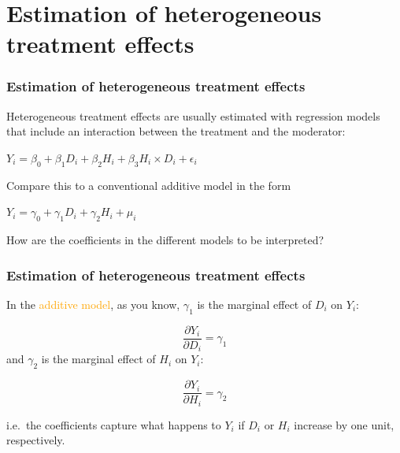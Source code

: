 \documentclass[12pt,english,dvipsnames,aspectratio=169,handout]{beamer}\usepackage[]{graphicx}\usepackage[]{xcolor}
\begin{document}
\section{Estimation of heterogeneous treatment effects}

\begin{frame}
  \frametitle{Estimation of heterogeneous treatment effects}
\footnotesize
Heterogeneous treatment effects are usually estimated with regression models that include an interaction between the treatment and the moderator:

$Y_i = \beta_0 + \beta_1 D_i + \beta_2 H_i + \beta_3 H_i \times D_i + \epsilon_i$

Compare this to a conventional additive model in the form

$Y_i = \gamma_0 + \gamma_1 D_i + \gamma_2 H_i + \mu_i$

How are the coefficients in the different models to be interpreted?

\vspace{2cm}
\end{frame}


\begin{frame}
  \frametitle{Estimation of heterogeneous treatment effects}
\footnotesize

In the \textcolor{orange}{additive model}, as you know, $\gamma_1$ is the marginal effect of $D_i$ on $Y_i$:	

\begin{equation*}
\frac{\partial Y_i}{\partial D_i} = \gamma_1
\end{equation*}
and $\gamma_2$ is the marginal effect of $H_i$ on $Y_i$:

\begin{equation*}
\frac{\partial Y_i}{\partial H_i} = \gamma_2
\end{equation*}

i.e.\ the coefficients capture what happens to $Y_i$ if $D_i$ or $H_i$ increase by one unit, respectively.

\vspace{1cm}
\end{frame}
\end{document}
